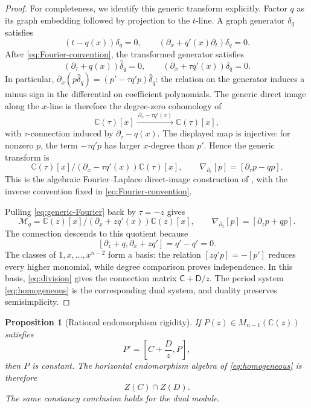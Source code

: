 \documentclass[11pt]{article}
\numberwithin{equation}{section}
\newtheorem{proposition}[proposition]{Proposition}
\theoremstyle{definition}
\theoremstyle{remark}
\newcommand{\C}{\mathbb C}
\newcommand{\Mcal}{\mathcal M}
\begin{document}
\begin{proof}
For completeness, we identify this generic transform explicitly.  Factor
$q$ as its graph embedding followed by projection to the $t$-line.  A graph
generator $\delta_q$ satisfies
\[
  (t-q(x))\delta_q=0,
  \qquad
  (\partial_x+q'(x)\partial_t)\delta_q=0.
\]
After \eqref{eq:Fourier-convention}, the transformed generator satisfies
\[
  (\partial_\tau+q(x))\widehat\delta_q=0,
  \qquad
  (\partial_x+\tau q'(x))\widehat\delta_q=0.
\]
In particular,
$\partial_x(p\widehat\delta_q)=(p'-\tau q'p)\widehat\delta_q$:
the relation on the generator induces a minus sign in the differential
on coefficient polynomials.  The generic direct image along the $x$-line
is therefore the degree-zero cohomology of
\[
  \C(\tau)[x]
  \xrightarrow{\ \partial_x-\tau q'(x)\ }
  \C(\tau)[x],
\]
with $\tau$-connection induced by $\partial_\tau-q(x)$.  The displayed
map is injective: for nonzero $p$, the term $-\tau q'p$ has larger
$x$-degree than $p'$.  Hence the generic transform is
\begin{equation}\label{eq:generic-Fourier}
  \C(\tau)[x]\big/
  (\partial_x-\tau q'(x))\C(\tau)[x],
  \qquad
  \nabla_{\partial_\tau}[p]=[\partial_\tau p-qp].
\end{equation}
This is the algebraic Fourier--Laplace direct-image construction of
\cite[\S1.3.b]{SabbahFourier}, with the inverse convention fixed in
\eqref{eq:Fourier-convention}.

Pulling \eqref{eq:generic-Fourier} back by $\tau=-z$ gives
\begin{equation}\label{eq:twisted-module}
  \Mcal_q=
  \C(z)[x]\big/(\partial_x+zq'(x))\C(z)[x],
  \qquad
  \nabla_{\partial_z}[p]=[\partial_zp+qp].
\end{equation}
The connection descends to this quotient because
\begin{equation}\label{eq:twisted-commutator}
  [\partial_z+q,\partial_x+zq']=q'-q'=0.
\end{equation}
The classes of $1,x,\ldots,x^{n-2}$ form a basis: the relation
$[zq'p]=-[p']$ reduces every higher monomial, while degree comparison proves
independence.  In this basis, \eqref{eq:division} gives the connection
matrix $\mathsf C+\mathsf D/z$.  The period system
\eqref{eq:homogeneous} is the corresponding dual system, and duality
preserves semisimplicity.
\end{proof}

\begin{proposition}[Rational endomorphism rigidity]
\label{prop:endomorphism-rigidity}
If $P(z)\in M_{n-1}(\C(z))$ satisfies
\begin{equation}\label{eq:endomorphism}
  P'=\left[C+\frac Dz,P\right],
\end{equation}
then $P$ is constant.  The horizontal endomorphism algebra of
\eqref{eq:homogeneous} is therefore
\[
  Z(C)\cap Z(D).
\]
The same constancy conclusion holds for the dual module.
\end{proposition}
\end{document}
